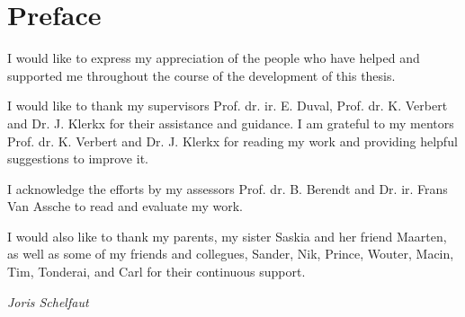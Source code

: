 \chapter*{Preface}


I would like to express my appreciation of the people who have helped and supported me throughout the course of the development of this thesis.

I would like to thank my supervisors Prof. dr. ir. E. Duval, Prof. dr. K. Verbert and Dr. J. Klerkx for their assistance and guidance. I am grateful to my mentors Prof. dr. K. Verbert and Dr. J. Klerkx for reading my work and providing helpful suggestions to improve it.

I acknowledge the efforts by my assessors Prof. dr. B. Berendt and Dr. ir. Frans Van Assche to read and evaluate my work.

I would also like to thank my parents, my sister Saskia and her friend Maarten, as well as some of my friends and collegues, Sander, Nik, Prince, Wouter, Macin, Tim, Tonderai, and Carl for their continuous support.




\begin{flushright}
	\emph{Joris Schelfaut}
\end{flushright}

